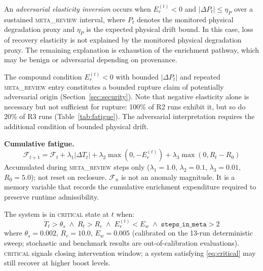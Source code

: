 \documentclass{llncs}
\newcommand{\st}[1]{\textup{\textsc{#1}}}
\begin{document}
\begin{definition}
\label{def:aei}
An \emph{adversarial elasticity inversion} occurs when $E_r^{(t)} < 0$
and $|\Delta P_t| \leq \eta_P$ over a sustained \st{meta\_review}
interval, where $P_t$ denotes the monitored physical degradation proxy
and $\eta_P$ is the expected physical drift bound. In this case, loss of
recovery elasticity is not explained by the monitored physical
degradation proxy. The remaining explanation is exhaustion of the
enrichment pathway, which may be benign or adversarial depending on
provenance.
\end{definition}

The compound condition $E_r^{(t)} < 0$ with bounded $|\Delta P_t|$ and
repeated \st{meta\_review} entry constitutes a bounded rupture claim of
potentially adversarial origin (Section~\ref{sec:security}). Note that
negative elasticity alone is necessary but not sufficient for rupture:
100\% of R2 runs exhibit it, but so do 20\% of R3 runs
(Table~\ref{tab:fatigue}). The adversarial interpretation requires the
additional condition of bounded physical drift.

\textbf{Cumulative fatigue.}
\begin{equation}
  \mathcal{F}_{t+1} = \mathcal{F}_t
    + \lambda_1 |\Delta T_t|
    + \lambda_2 \max(0, -E_r^{(t)})
    + \lambda_3 \max(0, R_t - R_0)
  \label{eq:fatigue}
\end{equation}
Accumulated during \st{meta\_review} steps only
($\lambda_1 = 1.0$, $\lambda_2 = 0.1$, $\lambda_3 = 0.01$,
$R_0 = 5.0$); not reset on reclosure. \(\mathcal{F}_n\) is not an anomaly magnitude. It is a memory variable
that records the cumulative enrichment expenditure required to preserve
runtime admissibility.

\begin{definition}[\st{critical} forecast]
\label{def:critical}
The system is in \st{critical} state at $t$ when:
\begin{equation}
  \dot{T}_t > \theta_s
  \;\land\;
  R_t > R_c
  \;\land\;
  E_r^{(t)} < E_w
  \;\land\;
  \mathtt{steps\_in\_meta} > 2
  \label{eq:critical}
\end{equation}
where $\theta_s = 0.002$, $R_c = 10.0$, $E_w = 0.005$ (calibrated on
the 13-run deterministic sweep; stochastic and benchmark results are
out-of-calibration evaluations). \st{critical} signals closing intervention
window; a system satisfying \eqref{eq:critical} may still recover at higher
boost levels.
\end{definition}
\end{document}
